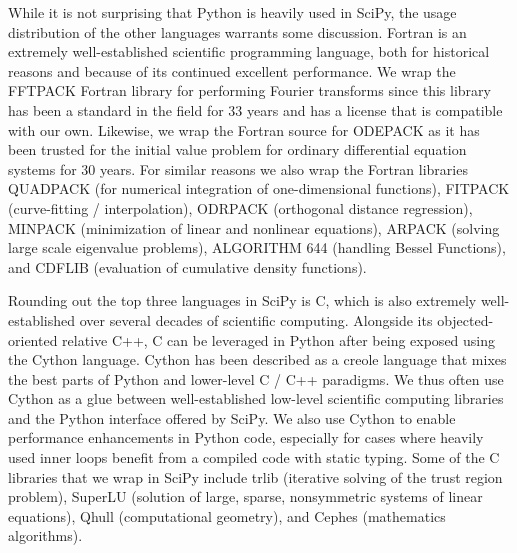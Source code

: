 \documentclass[fleqn,10pt]{wlscirep}
\begin{document}
While it is not surprising that Python is heavily used in SciPy, the usage
distribution of the other languages warrants some discussion. Fortran is an
extremely well-established scientific programming language, both for historical
reasons and because of its continued excellent
performance\cite{Koelbel:1993:HPF:562354}. We wrap the FFTPACK Fortran library
for performing Fourier transforms\cite{SWARZTRAUBER198445, SWARZTRAUBER198251}
since this library has been a standard in the field for 33 years and has a
license that is compatible with our own. Likewise, we wrap the Fortran source
for ODEPACK\cite{citeulike:2644528} as it has been  trusted for the initial
value problem for ordinary differential equation systems for 30 years. For
similar reasons we also wrap the Fortran libraries
QUADPACK\cite{1983qspa.book.....P} (for numerical integration of
one-dimensional functions), FITPACK\cite{Dierckx:1993:CSF:151103}
(curve-fitting / interpolation), ODRPACK\cite{ODRPACK_Boggs} (orthogonal
distance regression), MINPACK\cite{osti_6997568} (minimization of linear and
nonlinear equations), ARPACK\cite{leh:sor:yan96} (solving large scale
eigenvalue problems), ALGORITHM 644\cite{Amos:1986:APP:7921.214331} (handling
Bessel Functions), and CDFLIB\cite{CDFLIB_site} (evaluation of cumulative
density functions).

Rounding out the top three languages in SciPy is C, which is also extremely
well-established over several decades\cite{Kernighan:1988:CPL:576122} of
scientific computing. Alongside its objected-oriented relative C++, C can be
leveraged in Python after being exposed using the Cython language. Cython has
been described as a creole language that mixes the best parts of Python and
lower-level C / C++ paradigms\cite{behnel2011cython}. We thus often use Cython
as a glue between well-established low-level scientific computing libraries and
the Python interface offered by SciPy. We also use Cython to enable performance
enhancements in Python code, especially for cases where heavily used inner
loops benefit from a compiled code with static typing. Some of the C libraries
that we wrap in SciPy include trlib\cite{doi:10.1080/10556788.2018.1449842}
(iterative solving of the trust region problem),
SuperLU\cite{li05,superlu_ug99} (solution of large, sparse, nonsymmetric
systems of linear equations), Qhull\cite{Barber:1996:QAC:235815.235821}
(computational geometry), and Cephes\cite{cephes_netlib} (mathematics
algorithms). 
\end{document}
